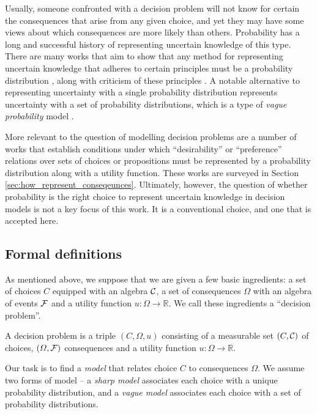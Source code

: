 Usually, someone confronted with a decision problem will not know for certain the consequences that arise from any given choice, and yet they may have some views about which consequences are more likely than others. Probability has a long and successful history of representing uncertain knowledge of this type. There are many works that aim to show that any method for representing uncertain knowledge that adheres to certain principles must be a probability distribution \citet{de_finetti_foresight_1992,horvitz_framework_1986}, along with criticism of these principles \citet{halpern_counter_1999}. A notable alternative to representing uncertainty with a single probability distribution represents uncertainty with a set of probability distributions, which is a type of \emph{vague probability} model \citep{walley_statistical_1991}. 

More relevant to the question of modelling decision problems are a number of works that establish conditions under which ``desirability'' or ``preference'' relations over sets of choices or propositions must be represented by a probability distribution along with a utility function. These works are surveyed in Section \ref{sec:how_represent_conseqeunces}. Ultimately, however, the question of whether probability is the right choice to represent uncertain knowledge in decision models is not a key focus of this work. It is a conventional choice, and one that is accepted here.

\subsection{Formal definitions}\label{sec:probability_set_models}

As mentioned above, we suppose that we are given a few basic ingredients: a set of choices $C$ equipped with an algebra $\mathcal{C}$, a set of consequences $\Omega$ with an algebra of events $\mathcal{F}$ and a utility function $u:\Omega\to \mathbb{R}$. We call these ingredients a ``decision problem''.

\begin{definition}
A decision problem is a triple $(C,\Omega,u)$ consisting of a measurable set $(C,\mathcal{C})$ of choices, $(\Omega,\mathcal{F})$ consequences and a utility function $u:\Omega\to \mathbb{R}$.
\end{definition}

Our task is to find a \emph{model} that relates choice $C$ to consequences $\Omega$. We assume two forms of model -- a \emph{sharp model} associates each choice with a unique probability distribution, and a \emph{vague model} associates each choice with a set of probability distributions.

